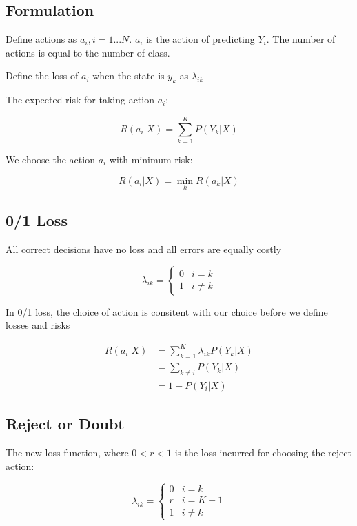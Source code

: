 \begin{multicols}{2}
\subsection{Formulation}

\noindent Define actions as $a_{i}, i=1...N$. $a_{i}$ is the action of predicting $Y_{i}$. The number of actions is equal to the number of class. 

\noindent Define the loss of $a_{i}$ when the state is $y_{k}$ as $\lambda_{ik}$

\noindent The expected risk for taking action $a_{i}$:

$$R(a_{i} | X) = \sum^{K}_{k=1} P(Y_{k} | X)$$

\noindent We choose the action $a_{i}$ with minimum risk:

$$R(a_{i}|X) = \!\min_{k} R(a_{k}|X)$$

\subsection{0/1 Loss}

\noindent All correct decisions have no loss and all errors are equally costly

$$
\lambda_{ik} = 
\begin{cases}
0 & i=k\\
1 & i \ne k
\end{cases}
$$

\noindent In 0/1 loss, the choice of action is consitent with our choice before we define losses and risks

\begin{equation}
\begin{split}
    R(a_i | X) &= \sum_{k=1}^K \lambda_{ik} P(Y_k|X) \\
    &= \sum_{k \ne i} P(Y_k | X) \\
    &= 1-P(Y_i|X)
\end{split}
\end{equation}

\subsection{Reject or Doubt}

\noindent The new loss function, where $0 < r < 1$ is the loss incurred for choosing the reject action:

$$
\lambda_{ik} = 
\begin{cases}
0 & i=k\\
r & i = K + 1 \\
1 & i \ne k
\end{cases}
$$


\end{multicols}
